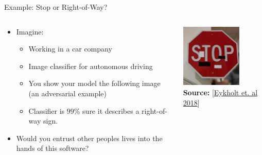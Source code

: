 \documentclass[11pt,compress,t,notes=noshow, aspectratio=169, xcolor=table]{beamer}
\begin{document}
\begin{vbframe}[c]{Example: Stop or Right-of-Way?}

\begin{columns}

	\begin{column}{0.5\textwidth}
	\begin{itemize} 
	    \item Imagine: 
	        \begin{itemize}
	            \item Working in a car company
	            \item Image classifier for autonomous driving
	            \item You show your model the following image (an adversarial example)
	            \item Classifier is $99\%$ sure it describes a right-of-way sign.
	        \end{itemize}  
	    \item Would you entrust other peoples lives into the hands of this software?
	\end{itemize}
	
	 \end{column}
	
	\begin{column}{0.5\textwidth}

	\begin{center}
		\includegraphics[width=0.7\textwidth]{figure/IntroStop.jpg}\\
		{\textbf{Source:} [\href{https://arxiv.org/abs/1707.08945}{Eykholt et. al 2018}]}
	\end{center}

     \end{column}

\end{columns}

\end{vbframe}
\end{document}
